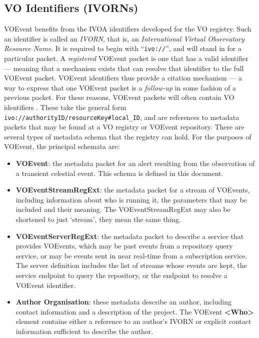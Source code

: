 \documentclass[11pt,a4paper]{ivoa}
\begin{document}
\subsection{VO Identifiers (IVORNs)}
\label{sec:2.2}
VOEvent benefits from the IVOA identifiers developed for the VO registry. Such 
an identifier is called an \emph{IVORN}, that is, an \emph{International Virtual
Observatory Resource Name}. It is required to begin with ``{\tt ivo://}'', and 
will stand in for a particular packet. A \emph{registered} VOEvent packet is one
that has a valid identifier --- meaning that a mechanism exists that can resolve
that identifier to the full VOEvent packet. VOEvent identifiers thus provide a 
citation mechanism --- a way to express that one VOEvent packet is a 
\emph{follow-up} in some fashion of a previous packet. For these reasons, 
VOEvent packets will often contain VO identifiers \citep{2016ivoa.spec.0523D}. 
These take the general form {\tt ivo://authorityID/resourceKey\#local\_ID}, and
are references to metadata packets that may be found at a VO registry or VOEvent
repository. There are several types of metadata schema that the registry can 
hold. For the purposes of VOEvent, the principal schemata are:
\begin{itemize}
\item {\bf VOEvent}: the metadata packet for an alert resulting from the 
observation of a transient celestial event. This schema is defined in this 
document. 
\item {\bf VOEventStreamRegExt}: the metadata packet for a stream of VOEvents, 
including information about who is running it, the parameters that may be 
included and their meaning. The VOEventStreamRegExt may also be shortened to 
just `stream', they mean the same thing. 
\item {\bf VOEventServerRegExt}: the metadata packet to describe a service that 
provides VOEvents, which may be past events from a repository query service, or 
may be events sent in near real-time from a subscription service. The server 
definition includes the list of streams whose events are kept, the service 
endpoint to query the repository, or the endpoint to resolve a VOEvent 
identifier. 
\item {\bf Author Organisation}: these metadata \citep{2007ivoa.spec.0302H} 
describe an author, including contact information and a description of the 
project. The VOEvent {\bf <Who>} element contains either a reference to an 
author's IVORN or explicit contact information sufficient to describe the 
author. 
\end{itemize}
\end{document}
